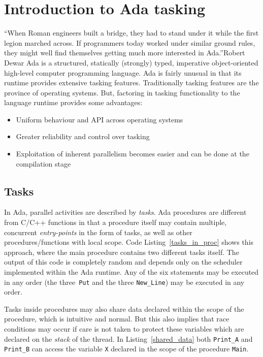 \chapter{Introduction to Ada tasking}{``When Roman engineers built a
  bridge, they had to stand under it while the first legion marched
  across. If programmers today worked under similar ground rules, they
  might well find themselves getting much more interested in
  Ada.''}{Robert Dewar}
\label{chap:intro_ada}
Ada is a structured, statically (strongly) typed, imperative
object-oriented high-level computer programming language.  Ada is
fairly unusual in that its runtime provides extensive tasking
features. Traditionally tasking features are the province of operating
systems. But, factoring in tasking functionality to the language
runtime provides some advantages:

\begin{itemize}
\item{Uniform behaviour and API across operating systems}
\item{Greater reliability and control over tasking}
\item{Exploitation of inherent parallelism becomes easier and can be
  done at the compilation stage}
\end{itemize}

\section{Tasks}
In Ada, parallel activities are described by \emph{tasks}. Ada
procedures are different from C/C++ functions in that a procedure
itself may contain multiple, concurrent \emph{entry-points} in the
form of tasks, as well as other procedures/functions with local
scope. Code Listing~\ref{tasks_in_proc} shows this approach, where the
main procedure contains two different tasks itself. The output of this
code is completely random and depends only on the scheduler
implemented within the Ada runtime. Any of the six statements may be
executed in any order (the three~\texttt{Put} and the three
\texttt{New\_Line}) may be executed in any order.

Tasks inside procedures may also share data declared within the scope
of the procedure, which is intuitive and normal. But this also implies
that race conditions may occur if care is not taken to protect these
variables which are declared on the \emph{stack} of the thread. In
Listing~\ref{shared_data} both \texttt{Print\_A} and \texttt{Print\_B}
can access the variable \texttt{X} declared in the scope of the
procedure \texttt{Main}.

